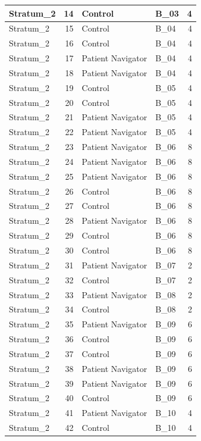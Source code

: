 \documentclass[
]{book}
\begin{document}
\begin{table}[H]
\begin{tabular}{l|r|l|l|r}
\hline
Stratum\_2 & 14 & Control & B\_03 & 4\\
\hline
Stratum\_2 & 15 & Control & B\_04 & 4\\
\hline
Stratum\_2 & 16 & Control & B\_04 & 4\\
\hline
Stratum\_2 & 17 & Patient Navigator & B\_04 & 4\\
\hline
Stratum\_2 & 18 & Patient Navigator & B\_04 & 4\\
\hline
Stratum\_2 & 19 & Control & B\_05 & 4\\
\hline
Stratum\_2 & 20 & Control & B\_05 & 4\\
\hline
Stratum\_2 & 21 & Patient Navigator & B\_05 & 4\\
\hline
Stratum\_2 & 22 & Patient Navigator & B\_05 & 4\\
\hline
Stratum\_2 & 23 & Patient Navigator & B\_06 & 8\\
\hline
Stratum\_2 & 24 & Patient Navigator & B\_06 & 8\\
\hline
Stratum\_2 & 25 & Patient Navigator & B\_06 & 8\\
\hline
Stratum\_2 & 26 & Control & B\_06 & 8\\
\hline
Stratum\_2 & 27 & Control & B\_06 & 8\\
\hline
Stratum\_2 & 28 & Patient Navigator & B\_06 & 8\\
\hline
Stratum\_2 & 29 & Control & B\_06 & 8\\
\hline
Stratum\_2 & 30 & Control & B\_06 & 8\\
\hline
Stratum\_2 & 31 & Patient Navigator & B\_07 & 2\\
\hline
Stratum\_2 & 32 & Control & B\_07 & 2\\
\hline
Stratum\_2 & 33 & Patient Navigator & B\_08 & 2\\
\hline
Stratum\_2 & 34 & Control & B\_08 & 2\\
\hline
Stratum\_2 & 35 & Patient Navigator & B\_09 & 6\\
\hline
Stratum\_2 & 36 & Control & B\_09 & 6\\
\hline
Stratum\_2 & 37 & Control & B\_09 & 6\\
\hline
Stratum\_2 & 38 & Patient Navigator & B\_09 & 6\\
\hline
Stratum\_2 & 39 & Patient Navigator & B\_09 & 6\\
\hline
Stratum\_2 & 40 & Control & B\_09 & 6\\
\hline
Stratum\_2 & 41 & Patient Navigator & B\_10 & 4\\
\hline
Stratum\_2 & 42 & Control & B\_10 & 4\\

\end{tabular}
\end{table}
\end{document}
